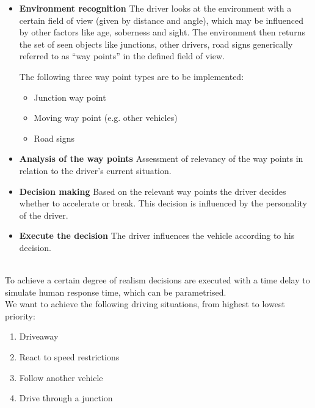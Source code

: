 \documentclass[a4paper,10pt,titlepage]{article}
\begin{document}
 \begin{itemize}
	\item \textbf{Environment recognition}\newline
				The driver looks at the environment with a certain field of view (given by distance and angle), which
				may be influenced by other factors like age, soberness and sight. The environment then returns the set 
				of seen objects like junctions, other drivers, road signs generically referred to as ``way points''
				in the defined field of view.

				The following three way point types are to be implemented:
				\begin{itemize}
					\item Junction way point
					\item Moving way point (e.g. other vehicles)
					\item Road signs
				\end{itemize}

	\item \textbf{Analysis of the way points}\newline
				Assessment of relevancy of the way points in relation to the driver's current situation.

	\item \textbf{Decision making}\newline
				Based on the relevant way points the driver decides whether to accelerate or break. This
				decision is influenced by the personality of the driver.

	\item \textbf{Execute the decision}\newline
				The driver influences the vehicle according to his decision.

 \end{itemize}\\

 To achieve a certain degree of realism decisions are executed with a time delay to simulate human response time,
 which can be parametrised.\\

 We want to achieve the following driving situations, from highest to lowest priority:
 \begin{enumerate}
	\item Driveaway
	\item React to speed restrictions
	\item Follow another vehicle
	\item Drive through a junction
 \end{enumerate}
\end{document}
